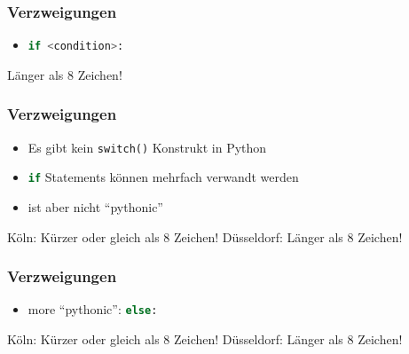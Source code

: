 \documentclass[ngerman]{beamer}
\newcommand{\ta}[1]{\textattachfile[color=1 0 0]{#1}{Code}}
\begin{document}
\begin{frame}[containsverbatim]
\frametitle{Verzweigungen}

\begin{itemize}
\item \lstinline[language={Python}]{if <condition>:}
\end{itemize}



\begin{ausgabe}
Länger als 8 Zeichen!
\end{ausgabe}
\end{frame}

\begin{frame}[containsverbatim]
\frametitle{Verzweigungen}

\begin{itemize}
\item Es gibt kein \texttt{switch()} Konstrukt in Python
\item \lstinline[language={Python}]{if} Statements können mehrfach verwandt werden
\item ist aber nicht \enquote{pythonic}
\end{itemize}



\begin{ausgabe}
Köln: Kürzer oder gleich als 8 Zeichen!
Düsseldorf: Länger als 8 Zeichen!
\end{ausgabe}
\end{frame}


\begin{frame}[containsverbatim]
\frametitle{Verzweigungen}

\begin{itemize}
\item more \enquote{pythonic}:  \lstinline[language={Python}]{else:}
\end{itemize}



\begin{ausgabe}
Köln: Kürzer oder gleich als 8 Zeichen!
Düsseldorf: Länger als 8 Zeichen!
\end{ausgabe}

\end{frame}
\end{document}
